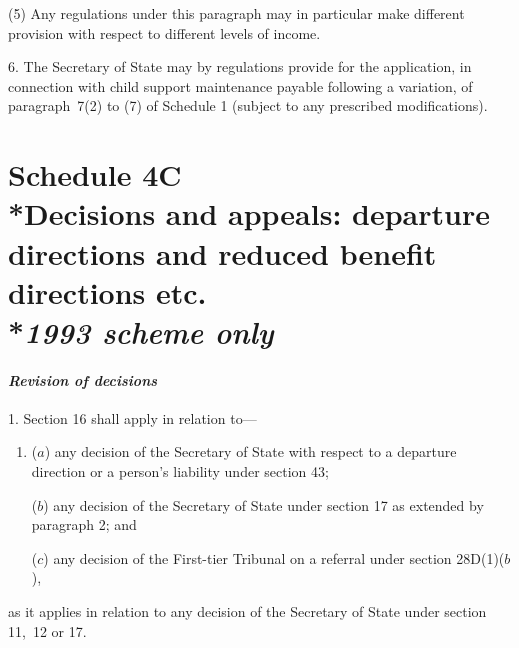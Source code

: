 \documentclass[12pt,a4paper]{article}
\begin{document}
(5) Any regulations under this paragraph may in particular make different provision with respect to different levels of income.

\medskip

6. The Secretary of State may by regulations provide for the application, in connection with child support maintenance payable following a variation, of paragraph~7(2)  to (7)  of Schedule 1 (subject to any prescribed modifications).

\part[Schedule 4C --- Decisions and appeals: departure directions and reduced benefit directions etc. --- \emph{1993 scheme only}]{Schedule 4C\\*Decisions and appeals: departure directions and reduced benefit directions etc.\\*\emph{1993 scheme only}}

\renewcommand\parthead{--- Schedule 4C}


\subsection*{\itshape Revision of decisions}

1. Section 16 shall apply in relation to—
\begin{enumerate}\item[]
($a$) any decision of the Secretary of State with respect to a departure direction
or a person’s liability under section 43;

($b$) any decision of the Secretary of State under section 17 as extended by paragraph 2; and

($c$) any decision of 
the First-tier Tribunal  %
on a referral under section 28D(1)($b$),
\end{enumerate}
as it applies in relation to any decision of the Secretary of State under section 11,~12 or 17.

\end{document}
